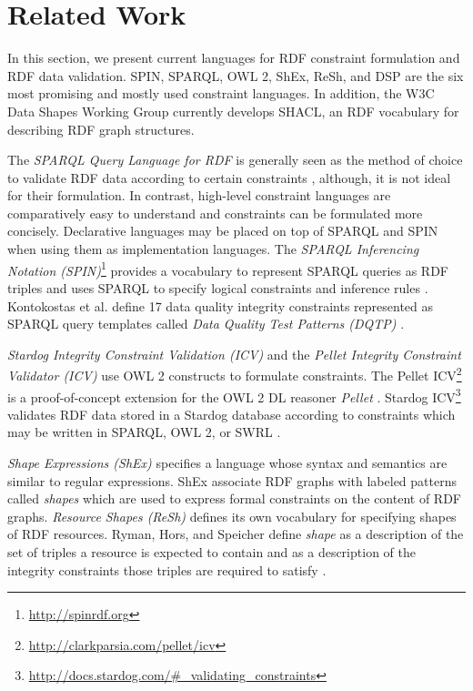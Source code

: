 \documentclass[a4paper,fontsize=11pt]{scrartcl}
\begin{document}
\section{Related Work}

In this section, we present current languages for RDF constraint formulation and RDF data validation. SPIN, SPARQL, OWL 2, ShEx, ReSh, and DSP are the six most promising and mostly used constraint languages. In addition, the W3C Data Shapes Working Group currently develops SHACL, an RDF vocabulary for describing RDF graph structures.

The \emph{SPARQL Query Language for RDF} \cite{W3C-SPARQL1.1-Query-Language-2013} is generally seen as the method of choice to validate RDF data according to certain constraints \cite{Fuerber2010}, 
although, it is not ideal for their formulation. 
In contrast, high-level constraint languages are comparatively easy to understand and constraints can be formulated more concisely.
Declarative languages may be placed on top of SPARQL and SPIN when using them as implementation languages. The \emph{SPARQL Inferencing Notation (SPIN)}\footnote{\url{http://spinrdf.org}} \cite{W3C-SPIN-2011} provides a vocabulary to represent SPARQL queries as RDF triples
and uses SPARQL to specify logical constraints and inference rules \cite{Fuerber2010}. Kontokostas et al. define 17 data quality integrity constraints represented as SPARQL query templates called \emph{Data Quality Test Patterns (DQTP)} \cite{Kontokostas2014}. 

\emph{Stardog Integrity Constraint Validation (ICV)} and the \emph{Pellet Integrity Constraint Validator (ICV)} use OWL 2 constructs to formulate constraints. The Pellet ICV\footnote{\url{http://clarkparsia.com/pellet/icv}} is a proof-of-concept extension for the OWL 2 DL reasoner \emph{Pellet} \cite{sirin2007pellet}. Stardog ICV\footnote{\url{http://docs.stardog.com/#_validating_constraints}} validates RDF data stored in a Stardog database according to constraints which may be written in SPARQL, OWL 2, or SWRL \cite{Horrocks04}. 

\emph{Shape Expressions (ShEx)} \cite{W3C-ShEx-Primer-2014,W3C-ShEx-Definition-2014,Prud'hommeaux-2014,Boneva-2014} specifies a language whose syntax and semantics are similar to regular expressions. ShEx associate RDF graphs with labeled patterns called \emph{shapes} which are used to express formal constraints on the content of RDF graphs. \emph{Resource Shapes (ReSh)} \cite{W3C-ReSh-2014} defines its own vocabulary for specifying shapes of RDF resources. Ryman, Hors, and Speicher define \emph{shape} as a description of the set of triples a resource is expected to contain and as a description of the integrity constraints those triples are required to satisfy \cite{Ryman2013}. 
\end{document}
